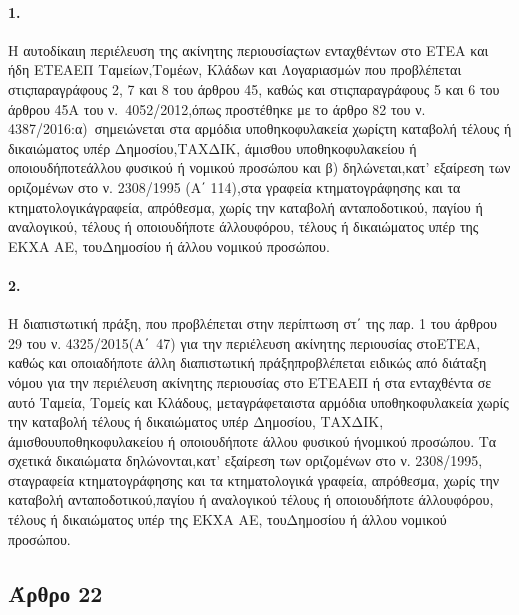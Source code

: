 \documentclass[a4paper,oneside, 10pt]{book}
\begin{document}
\paragraph { 1. } Η αυτοδίκαιη περιέλευση της ακίνητης περιουσίαςτων ενταχθέντων στο ΕΤΕΑ και ήδη ΕΤΕΑΕΠ Ταμείων,Τομέων, Κλάδων και Λογαριασμών που προβλέπεται στιςπαραγράφους 2, 7 και 8 του άρθρου 45, καθώς και στιςπαραγράφους 5 και 6 του άρθρου 45Α του ν. 4052/2012,όπως προστέθηκε με το άρθρο 82 του ν. 4387/2016:α) σημειώνεται στα αρμόδια υποθηκοφυλακεία χωρίςτη καταβολή τέλους ή δικαιώματος υπέρ Δημοσίου,ΤΑΧΔΙΚ, άμισθου υποθηκοφυλακείου ή οποιουδήποτεάλλου φυσικού ή νομικού προσώπου και β) δηλώνεται,κατ’ εξαίρεση των οριζομένων στο ν. 2308/1995 (Α΄ 114),στα γραφεία κτηματογράφησης και τα κτηματολογικάγραφεία, απρόθεσμα, χωρίς την καταβολή ανταποδοτικού, παγίου ή αναλογικού, τέλους ή οποιουδήποτε άλλουφόρου, τέλους ή δικαιώματος υπέρ της ΕΚΧΑ ΑΕ, τουΔημοσίου ή άλλου νομικού προσώπου.
\paragraph { 2. } Η διαπιστωτική πράξη, που προβλέπεται στην περίπτωση στ΄ της παρ. 1 του άρθρου 29 του ν. 4325/2015(Α΄ 47) για την περιέλευση ακίνητης περιουσίας στοΕΤΕΑ, καθώς και οποιαδήποτε άλλη διαπιστωτική πράξηπροβλέπεται ειδικώς από διάταξη νόμου για την περιέλευση ακίνητης περιουσίας στο ΕΤΕΑΕΠ ή στα ενταχθέντα σε αυτό Ταμεία, Τομείς και Κλάδους, μεταγράφεταιστα αρμόδια υποθηκοφυλακεία χωρίς την καταβολή τέλους ή δικαιώματος υπέρ Δημοσίου, ΤΑΧΔΙΚ, άμισθουυποθηκοφυλακείου ή οποιουδήποτε άλλου φυσικού ήνομικού προσώπου. Τα σχετικά δικαιώματα δηλώνονται,κατ’ εξαίρεση των οριζομένων στο ν. 2308/1995, σταγραφεία κτηματογράφησης και τα κτηματολογικά γραφεία, απρόθεσμα, χωρίς την καταβολή ανταποδοτικού,παγίου ή αναλογικού τέλους ή οποιουδήποτε άλλουφόρου, τέλους ή δικαιώματος υπέρ της ΕΚΧΑ ΑΕ, τουΔημοσίου ή άλλου νομικού προσώπου.
\subsection*{ Άρθρο 22 }
\end{document}
